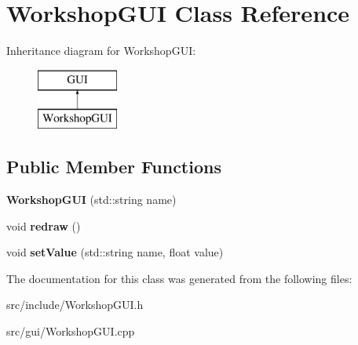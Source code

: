 \hypertarget{classWorkshopGUI}{\section{Workshop\-G\-U\-I Class Reference}
\label{classWorkshopGUI}
}
Inheritance diagram for Workshop\-G\-U\-I\-:\begin{figure}[H]
\begin{center}
\leavevmode
\includegraphics[height=2.000000cm]{classWorkshopGUI}
\end{center}
\end{figure}
\subsection*{Public Member Functions}
\begin{DoxyCompactItemize}
\item 
\hypertarget{classWorkshopGUI_af4b636b395eafa6ac762a6ad241a922f}{{\bfseries Workshop\-G\-U\-I} (std\-::string name)}\label{classWorkshopGUI_af4b636b395eafa6ac762a6ad241a922f}

\item 
\hypertarget{classWorkshopGUI_abaa68b1731ba8e97fcb73d10b948930b}{void {\bfseries redraw} ()}\label{classWorkshopGUI_abaa68b1731ba8e97fcb73d10b948930b}

\item 
\hypertarget{classWorkshopGUI_a8bd7d110ea4396da32970c59ec4c86e7}{void {\bfseries set\-Value} (std\-::string name, float value)}\label{classWorkshopGUI_a8bd7d110ea4396da32970c59ec4c86e7}

\end{DoxyCompactItemize}


The documentation for this class was generated from the following files\-:\begin{DoxyCompactItemize}
\item 
src/include/Workshop\-G\-U\-I.\-h\item 
src/gui/Workshop\-G\-U\-I.\-cpp\end{DoxyCompactItemize}

